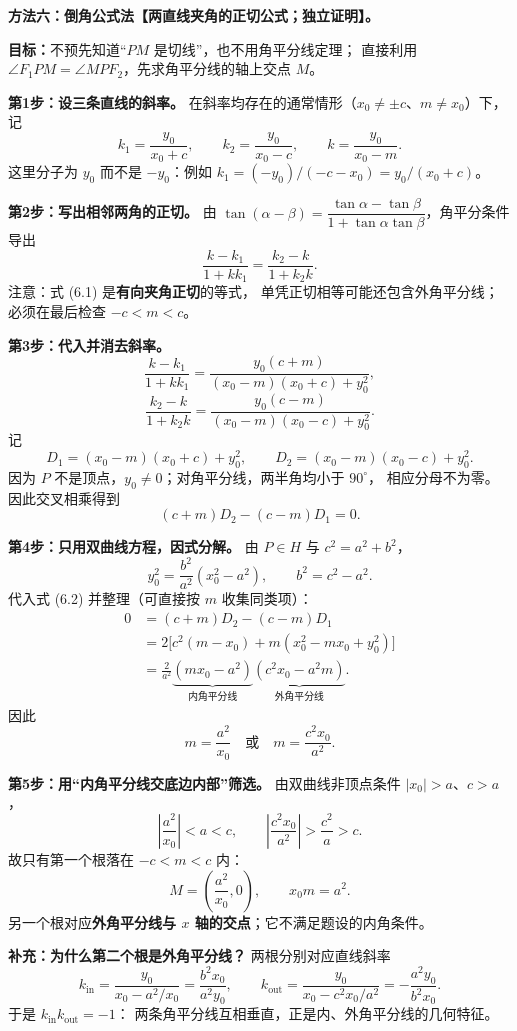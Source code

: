 \clearpage
\begin{proofbox}
\textbf{方法六：倒角公式法【两直线夹角的正切公式；独立证明】。}

\textbf{目标：}不预先知道“$PM$ 是切线”，也不用角平分线定理；
直接利用 $\angle F_1PM=\angle MPF_2$，先求角平分线的轴上交点 $M$。

\textbf{第1步：设三条直线的斜率。}
在斜率均存在的通常情形（$x_0\ne\pm c$、$m\ne x_0$）下，记
\[
\boxed{k_1=\frac{y_0}{x_0+c}},\qquad
\boxed{k_2=\frac{y_0}{x_0-c}},\qquad
\boxed{k=\frac{y_0}{x_0-m}}.
\]
这里分子为 $y_0$ 而不是 $-y_0$：例如
$k_1=(-y_0)/(-c-x_0)=y_0/(x_0+c)$。

\textbf{第2步：写出相邻两角的正切。}
由 $\tan(\alpha-\beta)=\dfrac{\tan\alpha-\tan\beta}
{1+\tan\alpha\tan\beta}$，角平分条件导出
\[
\boxed{\frac{k-k_1}{1+kk_1}=\frac{k_2-k}{1+k_2k}}.\tag{6.1}
\]
注意：式 (6.1) 是\textbf{有向夹角正切}的等式，
单凭正切相等可能还包含外角平分线；必须在最后检查 $-c<m<c$。

\textbf{第3步：代入并消去斜率。}
\[
\frac{k-k_1}{1+kk_1}
=\frac{y_0(c+m)}{(x_0-m)(x_0+c)+y_0^2},
\]
\[
\frac{k_2-k}{1+k_2k}
=\frac{y_0(c-m)}{(x_0-m)(x_0-c)+y_0^2}.
\]
记
\[
D_1=(x_0-m)(x_0+c)+y_0^2,\qquad
D_2=(x_0-m)(x_0-c)+y_0^2.
\]
因为 $P$ 不是顶点，$y_0\ne0$；对角平分线，两半角均小于 $90^\circ$，
相应分母不为零。因此交叉相乘得到
\[
(c+m)D_2-(c-m)D_1=0.\tag{6.2}
\]

\textbf{第4步：只用双曲线方程，因式分解。}
由 $P\in H$ 与 $c^2=a^2+b^2$，
\[
\boxed{y_0^2=\frac{b^2}{a^2}(x_0^2-a^2)},\qquad b^2=c^2-a^2.
\]
代入式 (6.2) 并整理（可直接按 $m$ 收集同类项）：
\[
\begin{aligned}
0&=(c+m)D_2-(c-m)D_1\\
 &=2\bigl[c^2(m-x_0)+m(x_0^2-mx_0+y_0^2)\bigr]\\
 &=\frac{2}{a^2}\underbrace{(mx_0-a^2)}_{\text{内角平分线}}
                   \underbrace{(c^2x_0-a^2m)}_{\text{外角平分线}}.
\end{aligned}
\]
因此
\[
\boxed{m=\frac{a^2}{x_0}}\quad\text{或}\quad
\boxed{m=\frac{c^2x_0}{a^2}}.
\]

\textbf{第5步：用“内角平分线交底边内部”筛选。}
由双曲线非顶点条件 $|x_0|>a$、$c>a$，
\[
\left|\frac{a^2}{x_0}\right|<a<c,
\qquad
\left|\frac{c^2x_0}{a^2}\right|>\frac{c^2}{a}>c.
\]
故只有第一个根落在 $-c<m<c$ 内：
\[
\boxed{M=\left(\frac{a^2}{x_0},0\right)},\qquad
\boxed{x_0m=a^2}.
\]
另一个根对应\textbf{外角平分线与 $x$ 轴的交点}；它不满足题设的内角条件。

\textbf{补充：为什么第二个根是外角平分线？}
两根分别对应直线斜率
\[
 k_{\mathrm{in}}=\frac{y_0}{x_0-a^2/x_0}
 =\frac{b^2x_0}{a^2y_0},\qquad
 k_{\mathrm{out}}=\frac{y_0}{x_0-c^2x_0/a^2}
 =-\frac{a^2y_0}{b^2x_0}.
\]
于是 $\boxed{k_{\mathrm{in}}k_{\mathrm{out}}=-1}$：
两条角平分线互相垂直，正是内、外角平分线的几何特征。


\end{proofbox}
